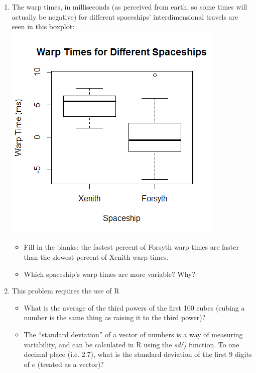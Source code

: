 \documentclass[12pt]{article}
\begin{document}
\begin{enumerate}
	\newpage
\item The warp times, in milliseconds (as perceived from earth, so some times will actually be negative) for different spaceships' interdimensional travels are seen in this boxplot: \includegraphics[scale=0.8]{boxplot} 
	\begin{itemize}
		\item Fill in the blanks: the fastest \qquad percent of Forsyth warp times are faster than the slowest \qquad percent of Xenith warp times.
		\item Which spaceship's warp times are more variable? Why? \vspace{10mm}
	\end{itemize}

	\item This problem requires the use of R
	\begin{itemize}
		\item What is the average of the third powers of the first 100 cubes (cubing a number is the same thing as raising it to the third power)? \vspace{5mm}
		\item The ``standard deviation'' of a vector of numbers is a way of measuring variability, and can be calculated in R using the \textit{sd()} function. To one decimal place (i.e. 2.7), what is the standard deviation of the first 9 digits of $e$ (treated as a vector)? 
	\end{itemize}


\end{enumerate}
\end{document}

